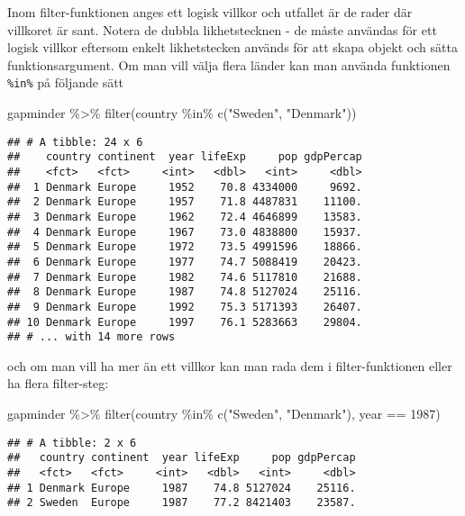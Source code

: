 \documentclass[
]{book}
\newenvironment{Shaded}{\begin{snugshade}}{\end{snugshade}}
\newcommand{\DecValTok}[1]{\textcolor[rgb]{0.00,0.00,0.81}{#1}}
\newcommand{\FunctionTok}[1]{\textcolor[rgb]{0.00,0.00,0.00}{#1}}
\newcommand{\NormalTok}[1]{#1}
\newcommand{\SpecialCharTok}[1]{\textcolor[rgb]{0.00,0.00,0.00}{#1}}
\newcommand{\StringTok}[1]{\textcolor[rgb]{0.31,0.60,0.02}{#1}}
\theoremstyle{definition}
\theoremstyle{definition}
\theoremstyle{definition}
\theoremstyle{definition}
\theoremstyle{remark}
\begin{document}
Inom filter-funktionen anges ett logisk villkor och utfallet är de rader där villkoret är sant. Notera de dubbla likhetstecknen - de måste användas för ett logisk villkor eftersom enkelt likhetstecken används för att skapa objekt och sätta funktionsargument. Om man vill välja flera länder kan man använda funktionen \texttt{\%in\%} på följande sätt

\begin{Shaded}
\begin{Highlighting}[]
\NormalTok{gapminder }\SpecialCharTok{\%\textgreater{}\%} 
  \FunctionTok{filter}\NormalTok{(country }\SpecialCharTok{\%in\%} \FunctionTok{c}\NormalTok{(}\StringTok{"Sweden"}\NormalTok{, }\StringTok{"Denmark"}\NormalTok{))}
\end{Highlighting}
\end{Shaded}

\begin{verbatim}
## # A tibble: 24 x 6
##    country continent  year lifeExp     pop gdpPercap
##    <fct>   <fct>     <int>   <dbl>   <int>     <dbl>
##  1 Denmark Europe     1952    70.8 4334000     9692.
##  2 Denmark Europe     1957    71.8 4487831    11100.
##  3 Denmark Europe     1962    72.4 4646899    13583.
##  4 Denmark Europe     1967    73.0 4838800    15937.
##  5 Denmark Europe     1972    73.5 4991596    18866.
##  6 Denmark Europe     1977    74.7 5088419    20423.
##  7 Denmark Europe     1982    74.6 5117810    21688.
##  8 Denmark Europe     1987    74.8 5127024    25116.
##  9 Denmark Europe     1992    75.3 5171393    26407.
## 10 Denmark Europe     1997    76.1 5283663    29804.
## # ... with 14 more rows
\end{verbatim}

och om man vill ha mer än ett villkor kan man rada dem i filter-funktionen eller ha flera filter-steg:

\begin{Shaded}
\begin{Highlighting}[]
\NormalTok{gapminder }\SpecialCharTok{\%\textgreater{}\%} 
  \FunctionTok{filter}\NormalTok{(country }\SpecialCharTok{\%in\%} \FunctionTok{c}\NormalTok{(}\StringTok{"Sweden"}\NormalTok{, }\StringTok{"Denmark"}\NormalTok{),}
\NormalTok{         year }\SpecialCharTok{==} \DecValTok{1987}\NormalTok{)}
\end{Highlighting}
\end{Shaded}

\begin{verbatim}
## # A tibble: 2 x 6
##   country continent  year lifeExp     pop gdpPercap
##   <fct>   <fct>     <int>   <dbl>   <int>     <dbl>
## 1 Denmark Europe     1987    74.8 5127024    25116.
## 2 Sweden  Europe     1987    77.2 8421403    23587.
\end{verbatim}
\end{document}
